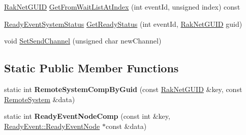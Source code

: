 \begin{DoxyCompactItemize}
\item 
\hyperlink{struct_rak_net_1_1_rak_net_g_u_i_d}{Rak\-Net\-G\-U\-I\-D} \hyperlink{class_rak_net_1_1_ready_event_af38ea2b77651a37774e31bdbf5d663de}{Get\-From\-Wait\-List\-At\-Index} (int event\-Id, unsigned index) const 
\item 
\hyperlink{group___r_e_a_d_y___e_v_e_n_t___g_r_o_u_p_gaf87e91389822570de07c01ccb37b0bbf}{Ready\-Event\-System\-Status} \hyperlink{class_rak_net_1_1_ready_event_a43a6b3450223af740ef2a66bb3db6f87}{Get\-Ready\-Status} (int event\-Id, \hyperlink{struct_rak_net_1_1_rak_net_g_u_i_d}{Rak\-Net\-G\-U\-I\-D} guid)
\item 
void \hyperlink{class_rak_net_1_1_ready_event_a6355b9958259b6e645bb335a1b7b34a1}{Set\-Send\-Channel} (unsigned char new\-Channel)
\end{DoxyCompactItemize}
\subsection*{Static Public Member Functions}
\begin{DoxyCompactItemize}
\item 
\hypertarget{class_rak_net_1_1_ready_event_a714ed279d9c026734ef58c713bc455aa}{static int {\bfseries Remote\-System\-Comp\-By\-Guid} (const \hyperlink{struct_rak_net_1_1_rak_net_g_u_i_d}{Rak\-Net\-G\-U\-I\-D} \&key, const \hyperlink{struct_rak_net_1_1_ready_event_1_1_remote_system}{Remote\-System} \&data)}\label{class_rak_net_1_1_ready_event_a714ed279d9c026734ef58c713bc455aa}

\item 
\hypertarget{class_rak_net_1_1_ready_event_ae80eee9ab162558f840b53983a20e0de}{static int {\bfseries Ready\-Event\-Node\-Comp} (const int \&key, \hyperlink{struct_rak_net_1_1_ready_event_1_1_ready_event_node}{Ready\-Event\-::\-Ready\-Event\-Node} $\ast$const \&data)}\label{class_rak_net_1_1_ready_event_ae80eee9ab162558f840b53983a20e0de}

\end{DoxyCompactItemize}
